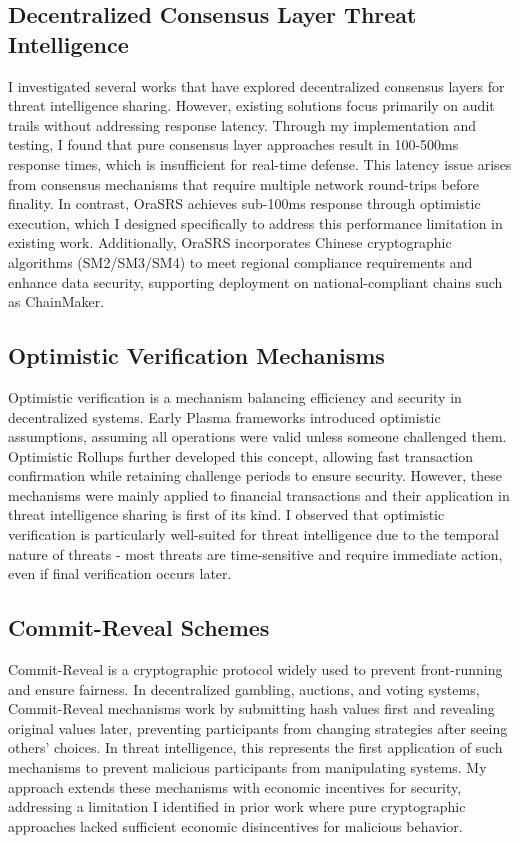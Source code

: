 \documentclass[12pt]{article}
\begin{document}
\subsection{Decentralized Consensus Layer Threat Intelligence}
I investigated several works that have explored decentralized consensus layers for threat intelligence sharing. However, existing solutions focus primarily on audit trails without addressing response latency. Through my implementation and testing, I found that pure consensus layer approaches result in 100-500ms response times, which is insufficient for real-time defense. This latency issue arises from consensus mechanisms that require multiple network round-trips before finality. In contrast, OraSRS achieves sub-100ms response through optimistic execution, which I designed specifically to address this performance limitation in existing work. Additionally, OraSRS incorporates Chinese cryptographic algorithms (SM2/SM3/SM4) to meet regional compliance requirements and enhance data security, supporting deployment on national-compliant chains such as ChainMaker.

\subsection{Optimistic Verification Mechanisms}
Optimistic verification is a mechanism balancing efficiency and security in decentralized systems. Early Plasma frameworks introduced optimistic assumptions, assuming all operations were valid unless someone challenged them. Optimistic Rollups further developed this concept, allowing fast transaction confirmation while retaining challenge periods to ensure security. However, these mechanisms were mainly applied to financial transactions and their application in threat intelligence sharing is first of its kind. I observed that optimistic verification is particularly well-suited for threat intelligence due to the temporal nature of threats - most threats are time-sensitive and require immediate action, even if final verification occurs later.

\subsection{Commit-Reveal Schemes}
Commit-Reveal is a cryptographic protocol widely used to prevent front-running and ensure fairness. In decentralized gambling, auctions, and voting systems, Commit-Reveal mechanisms work by submitting hash values first and revealing original values later, preventing participants from changing strategies after seeing others' choices. In threat intelligence, this represents the first application of such mechanisms to prevent malicious participants from manipulating systems. My approach extends these mechanisms with economic incentives for security, addressing a limitation I identified in prior work where pure cryptographic approaches lacked sufficient economic disincentives for malicious behavior.
\end{document}
